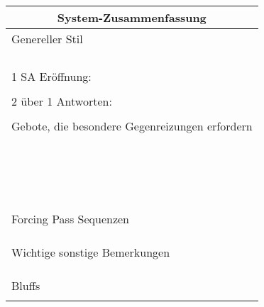 \documentclass{article}
\begin{document}
\begin{multicols}{3}
\begin{tabular}{|l|}
\hline \multicolumn{1}{c}{\bf \Large System-Zusammenfassung} \\
\hline Genereller Stil \\
\\
\\
\\
\\
\hline 1 SA Eröffnung: \\
\\
\hline 2 über 1 Antworten: \\
\\
\hline Gebote, die besondere Gegenreizungen erfordern \\
\\
\\
\\
\\
\\
\\
\\
\\
\\
\\
\\
\\
\\
\\
\\
\\
\\
\hline Forcing Pass Sequenzen \\
\\
\\
\\
\hline Wichtige sonstige Bemerkungen \\
\\
\\
\\
\hline Bluffs \\
\\
\hline \end{tabular}

\end{multicols}
\end{document}
